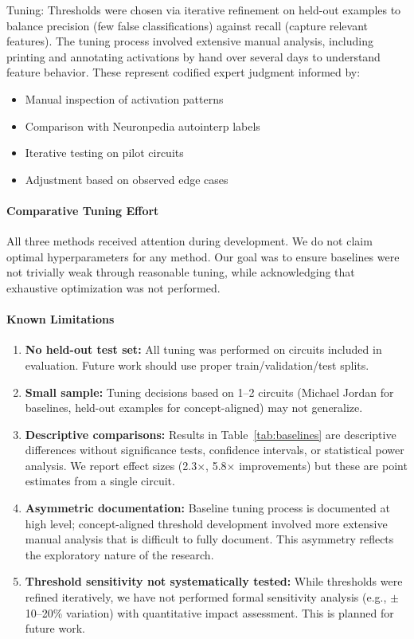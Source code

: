 Tuning: Thresholds were chosen via iterative refinement on held-out examples to balance precision (few false classifications) against recall (capture relevant features). The tuning process involved extensive manual analysis, including printing and annotating activations by hand over several days to understand feature behavior. These represent codified expert judgment informed by:
\begin{itemize}
  \item Manual inspection of activation patterns
  \item Comparison with Neuronpedia autointerp labels
  \item Iterative testing on pilot circuits
  \item Adjustment based on observed edge cases
\end{itemize}

\paragraph{Comparative Tuning Effort}
All three methods received attention during development. We do not claim optimal hyperparameters for any method. Our goal was to ensure baselines were not trivially weak through reasonable tuning, while acknowledging that exhaustive optimization was not performed.

\paragraph{Known Limitations}
\begin{enumerate}
  \item \textbf{No held-out test set:} All tuning was performed on circuits included in evaluation. Future work should use proper train/validation/test splits.
   
  \item \textbf{Small sample:} Tuning decisions based on 1--2 circuits (Michael Jordan for baselines, held-out examples for concept-aligned) may not generalize.

  \item \textbf{Descriptive comparisons:} Results in Table~\ref{tab:baselines} are descriptive differences without significance tests, confidence intervals, or statistical power analysis. We report effect sizes (2.3$\times$, 5.8$\times$ improvements) but these are point estimates from a single circuit.

  \item \textbf{Asymmetric documentation:} Baseline tuning process is documented at high level; concept-aligned threshold development involved more extensive manual analysis that is difficult to fully document. This asymmetry reflects the exploratory nature of the research.

  \item \textbf{Threshold sensitivity not systematically tested:} While thresholds were refined iteratively, we have not performed formal sensitivity analysis (e.g., $\pm$10--20\% variation) with quantitative impact assessment. This is planned for future work.
\end{enumerate}

